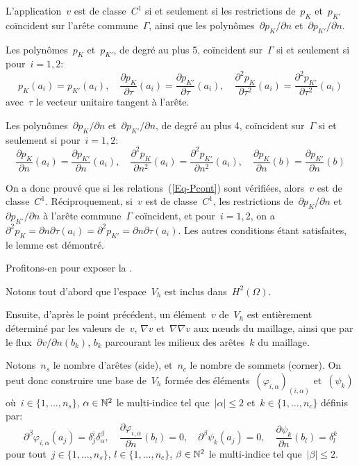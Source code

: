 L'application~$v$ est de classe~$C^1$ si et seulement si les restrictions de~$p_K$ et~$p_{K'}$ coïncident sur l'arête commune~$\Gamma$, ainsi que les polynômes~$\partial p_K/\partial n$ et~$\partial p_{K'}/\partial n$.

Les polynômes~$p_K$ et~$p_{K'}$, de degré au plus 5, coïncident sur~$\Gamma$ si et seulement si pour~$i=1,2$:
\[ p_K(a_i)=p_{K'}(a_i), \quad
\dfrac{\partial p_K}{\partial\tau}(a_i)=\dfrac{\partial p_{K'}}{\partial\tau}(a_i), \quad
\dfrac{\partial^2 p_K}{\partial\tau^2}(a_i)=\dfrac{\partial^2 p_{K'}}{\partial \tau^2}(a_i)
\]
avec~$\tau$ le vecteur unitaire tangent à l'arête.

Les polynômes~$\partial p_K/\partial n$ et~$\partial p_{K'}/\partial n$, de degré au plus 4, coïncident sur~$\Gamma$ si et seulement si pour~$i=1,2$:
\[ 
\dfrac{\partial p_K}{\partial n}(a_i)=\dfrac{\partial p_{K'}}{\partial n}(a_i), \quad
\dfrac{\partial^2 p_K}{\partial n^2}(a_i)=\dfrac{\partial^2 p_{K'}}{\partial n^2}(a_i), \quad
\dfrac{\partial p_K}{\partial n}(b)=\dfrac{\partial p_{K'}}{\partial n}(b)\]

On a donc prouvé que si les relations~(\ref{Eq-Pcont}) sont vérifiées, alors~$v$ est de classe~$C^1$.
Réciproquement, si~$v$ est de classe~$C^1$, les restrictions de~$\partial p_K/\partial n$ et~$\partial p_{K'}/\partial n$ à l'arête commune~$\Gamma$ coïncident, et pour~$i=1,2$, on a~$\partial^2 p_K=\partial n\partial\tau (a_i)=\partial^2 p_{K'}=\partial n\partial\tau (a_i)$. Les autres conditions étant satisfaites, le lemme est démontré.

\medskip
Profitons-en pour exposer la .

Notons tout d'abord que l'espace~$V_h$ est inclus dans~$H^2(\Omega)$.

Ensuite, d'après le point précédent, un élément~$v$ de~$V_h$ est entièrement déterminé par les valeurs de~$v$, $\nabla v$ et~$\nabla \nabla v$ aux nœuds du maillage, ainsi que par le flux~$\partial v/\partial n(b_k)$, $b_k$ parcourant les milieux des arêtes~$k$ du maillage.

Notons~$n_s$ le nombre d'arêtes (side), et~$n_c$ le nombre de sommets (corner).
On peut donc construire une base de~$V_h$ formée des éléments~$(\varphi_{i,\alpha})_{(i,\alpha)}$ et~$(\psi_k)$ où~$i\in\{1, ..., n_s\}$, $\alpha\in\mathbb N^2$ le multi-indice tel que~$|\alpha|\le2$ et~$k\in\{1, ..., n_c\}$ définis par:
\[ \partial^\beta\varphi_{i,\alpha}(a_j)=\delta^i_j\delta^\beta_\alpha, \quad
\dfrac{\partial\varphi_{i,\alpha}}{\partial n}(b_l)=0, \quad
\partial^\beta\psi_k(a_j)=0, \quad
\dfrac{\partial\psi_k}{\partial n}(b_l)=\delta^k_l \]
pour tout~$j\in\{1, ..., n_s\}$, $l\in\{1, ..., n_c\}$, $\beta\in\mathbb N^2$ le multi-indice tel que~$|\beta|\le2$.

